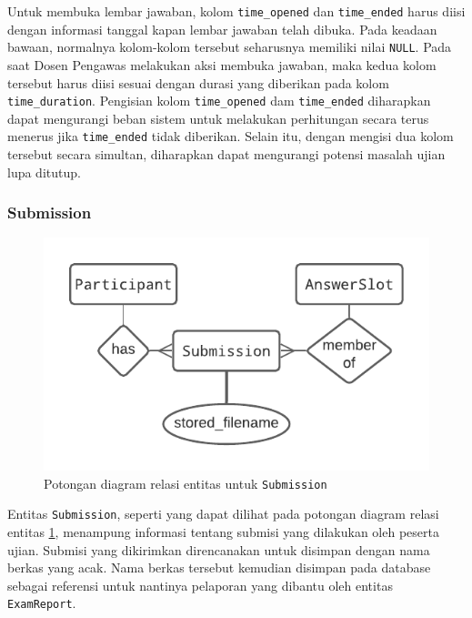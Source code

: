     Untuk membuka lembar jawaban, kolom \texttt{time\_opened} dan
    \texttt{time\_ended} harus diisi dengan informasi tanggal kapan lembar
    jawaban telah dibuka. Pada keadaan bawaan, normalnya kolom-kolom tersebut
    seharusnya memiliki nilai \texttt{NULL}. Pada saat Dosen Pengawas melakukan
    aksi membuka jawaban, maka kedua kolom tersebut harus diisi sesuai dengan
    durasi yang diberikan pada kolom \texttt{time\_duration}. Pengisian kolom
    \texttt{time\_opened} dam \texttt{time\_ended} diharapkan dapat mengurangi
    beban sistem untuk melakukan perhitungan secara terus menerus jika
    \texttt{time\_ended} tidak diberikan. Selain itu, dengan mengisi dua kolom
    tersebut secara simultan, diharapkan dapat mengurangi potensi masalah ujian
    lupa ditutup.
    
\subsubsection{Submission}
    
    \begin{figure}[H]
        \centering
        \includegraphics{Gambar/erd-details/ERD--New - Submission.pdf}
        \caption{Potongan diagram relasi entitas untuk \texttt{Submission}}
        \label{fig:erd_submission}
    \end{figure}

    Entitas \texttt{Submission}, seperti yang dapat dilihat pada potongan
    diagram relasi entitas \ref{fig:erd_submission}, menampung informasi tentang
    submisi yang dilakukan oleh peserta ujian. Submisi yang dikirimkan
    direncanakan untuk disimpan dengan nama berkas yang acak. Nama berkas
    tersebut kemudian disimpan pada database sebagai referensi untuk nantinya
    pelaporan yang dibantu oleh entitas \texttt{ExamReport}.
    
